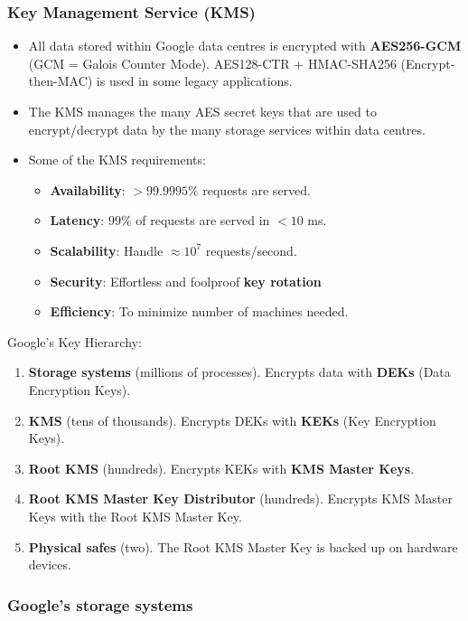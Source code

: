 \documentclass[12pt,titlepage]{article}
\begin{document}
\subsubsection{Key Management Service (KMS)}
\begin{itemize}
	\item All data stored within Google data centres is encrypted with \textbf{AES256-GCM} (GCM = Galois Counter Mode). AES128-CTR + HMAC-SHA256 (Encrypt-then-MAC) is used in some legacy applications.
	\item The KMS manages the many AES secret keys that are used to encrypt/decrypt data by the many storage services within data centres.
	\item Some of the KMS requirements:\begin{itemize}
		\item \textbf{Availability}: $> 99.9995\%$ requests are served.
		\item \textbf{Latency}: $99\%$ of requests are served in $< 10$ ms.
		\item \textbf{Scalability}: Handle $\approx 10^7$ requests/second.
		\item \textbf{Security}: Effortless and foolproof \textbf{key rotation}
		\item \textbf{Efficiency}: To minimize number of machines needed.
	\end{itemize}
\end{itemize}

Google’s Key Hierarchy: \begin{enumerate}
	\item \textbf{Storage systems} (millions of processes). Encrypts data with \textbf{DEKs} (Data Encryption Keys).
	\item \textbf{KMS} (tens of thousands). Encrypts DEKs with \textbf{KEKs} (Key Encryption Keys).
	\item \textbf{Root KMS} (hundreds). Encrypts KEKs with \textbf{KMS Master Keys}.
	\item \textbf{Root KMS Master Key Distributor} (hundreds). Encrypts KMS Master Keys with the Root KMS Master Key.
	\item \textbf{Physical safes} (two). The Root KMS Master Key is backed up on hardware devices.
\end{enumerate}

\subsubsection{Google's storage systems}
\end{document}
